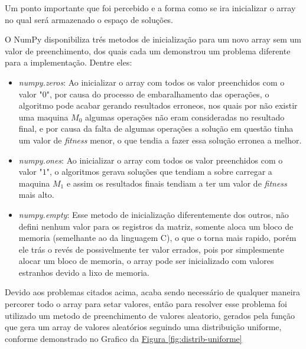                 Um ponto importante que foi percebido e a forma como se ira inicializar o array no qual será armazenado o espaço de soluções.\newline

                O NumPy disponibiliza trés metodos de inicialização para um novo array sem um valor de preenchimento, dos quais cada um demonstrou um problema diferente para a implementação. Dentre eles: 
                \begin{itemize}
                    \item \textit{numpy.zeros}: Ao inicializar o array com todos os valor preenchidos com o valor "$0$", por causa do processo de embaralhamento das operações, o algoritmo pode acabar gerando resultados erroneos, nos quais por não existir uma maquina $M_0$ algumas operações não eram consideradas no resultado final, e por causa da falta de algumas operações a solução em questão tinha um valor de \textit{fitness} menor, o que tendia a fazer essa solução erronea a melhor.

                    \item \textit{numpy.ones}: Ao inicializar o array com todos os valor preenchidos com o valor "$1$", o algoritmos gerava soluções que tendiam a sobre carregar a maquina $M_1$ e assim os resultados finais tendiam a ter um valor de \textit{fitness} mais alto.

                    \item \textit{numpy.empty}: Esse metodo de inicialização diferentemente dos outros, não defini nenhum valor para os registros da matriz, somente aloca um bloco de memoria (semelhante ao  da linguagem C), o que o torna mais rapido, porém ele trás o revés de possivelmente ter valor errados, pois por simplesmente alocar um bloco de memoria, o array pode ser inicializado com valores estranhos devido a lixo de memoria.
                \end{itemize}

                \noindent Devido aos problemas citados acima, acaba sendo necessário de qualquer maneira percorer todo o array para setar valores, 
                então para resolver esse problema foi utilizado um metodo de preenchimento de valores aleatorio, 
                gerados pela função  que gera um array de valores aleatórios seguindo uma distribuição uniforme, 
                conforme demonstrado no Grafico da \hyperref[fig:distrib-uniforme]{Figura \ref{fig:distrib-uniforme}}

